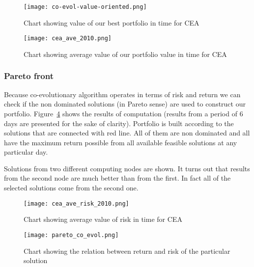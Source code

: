 \begin{figure}[ht]
  \begin{center}
    \texttt{[image: co-evol-value-oriented.png]}
  \end{center}
  \caption{Chart showing value of our best portfolio in time for CEA}
  \label{fig:co_eval_return}
\end{figure}

\begin{figure}[ht]
  \begin{center}
    \texttt{[image: cea\_ave\_2010.png]}
  \end{center}
  \caption{Chart showing average value of our portfolio value in time for CEA}
  \label{fig:co_eval_return}
\end{figure}

\subsubsection{Pareto front}

Because co-evolutionary algorithm operates in terms of risk and return we can check if the non dominated solutions (in Pareto sense) are used to construct our portfolio.
Figure~\ref{fig:pareto_co_evol} shows the results of computation (results from a period of 6 days are presented for the sake of clarity). 
Portfolio is built according to the solutions that are connected with red line.
All of them are non dominated and all have the maximum return possible from all available feasible solutions at any particular day.

Solutions from two different computing nodes are shown.
It turns out that results from the second node are much better than from the first.
In fact all of the selected solutions come from the second one.

\begin{figure}[ht]
  \begin{center}
    \texttt{[image: cea\_ave\_risk\_2010.png]}
  \end{center}
  \caption{Chart showing average value of risk in time for CEA}
  \label{fig:co_eval_risk}
\end{figure}

\begin{figure}[ht]
  \begin{center}
    \texttt{[image: pareto\_co\_evol.png]}
  \end{center}
  \caption{Chart showing the relation between return and risk of the particular solution}
  \label{fig:pareto_co_evol}
\end{figure}


